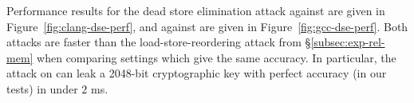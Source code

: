 Performance results for the dead store elimination attack against {\CLANG}
are given in Figure~\ref{fig:clang-dse-perf}, and against {\GCC} are given in
Figure~\ref{fig:gcc-dse-perf}.
Both attacks are faster than the load-store-reordering attack from
\S\ref{subsec:exp-rel-mem} when comparing settings which give the same
accuracy.
In particular, the attack on {\GCC} can leak a 2048-bit cryptographic
key with perfect accuracy (in our tests) in under $2$ ms.
